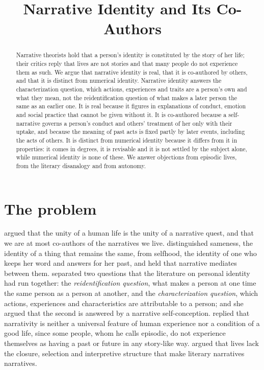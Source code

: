 \documentclass{situationist-preprint}
\title{Narrative Identity and Its Co-Authors}
\begin{document}
\maketitle

\begin{abstract}
Narrative theorists hold that a person's identity is constituted by the story of her life; their critics reply that lives are not stories and that many people do not experience them as such. We argue that narrative identity is real, that it is co-authored by others, and that it is distinct from numerical identity. Narrative identity answers the characterization question, which actions, experiences and traits are a person's own and what they mean, not the reidentification question of what makes a later person the same as an earlier one. It is real because it figures in explanations of conduct, emotion and social practice that cannot be given without it. It is co-authored because a self-narrative governs a person's conduct and others' treatment of her only with their uptake, and because the meaning of past acts is fixed partly by later events, including the acts of others. It is distinct from numerical identity because it differs from it in properties: it comes in degrees, it is revisable and it is not settled by the subject alone, while numerical identity is none of these. We answer objections from episodic lives, from the literary disanalogy and from autonomy.
\end{abstract}

\section{The problem}

\citet[ch.~15]{MacIntyre1981} argued that the unity of a human life is the unity of a narrative quest, and that we are at most co-authors of the narratives we live. \citet{Ricoeur1992} distinguished sameness, the identity of a thing that remains the same, from selfhood, the identity of one who keeps her word and answers for her past, and held that narrative mediates between them. \citet{Schechtman1996} separated two questions that the literature on personal identity had run together: the \emph{reidentification question}, what makes a person at one time the same person as a person at another, and the \emph{characterization question}, which actions, experiences and characteristics are attributable to a person; and she argued that the second is answered by a narrative self-conception. \citet{GStrawson2004} replied that narrativity is neither a universal feature of human experience nor a condition of a good life, since some people, whom he calls episodic, do not experience themselves as having a past or future in any story-like way. \citet{Lamarque2004} argued that lives lack the closure, selection and interpretive structure that make literary narratives narratives.
\end{document}
